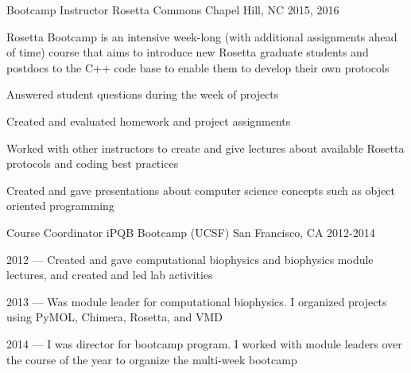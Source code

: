 

\begin{cventries}

  \cventry
  {Bootcamp Instructor} %
  {Rosetta Commons} %
  {Chapel Hill, NC} %
  {2015, 2016} %
  {
    \begin{cvitems} %
    \item Rosetta Bootcamp is an intensive week-long (with additional assignments ahead of time) course
      that aims to introduce new Rosetta graduate students and postdocs to the C++ code base
      to enable them to develop their own protocols
    \item Answered student questions during the week of projects
    \item Created and evaluated homework and project assignments
    \item Worked with other instructors to create and give lectures about available Rosetta protocols and coding best practices
    \item Created and gave presentations about computer science concepts such as object oriented programming
    \end{cvitems}
  }

  \cventry
  {Course Coordinator} %
  {iPQB Bootcamp (UCSF)} %
  {San Francisco, CA} %
  {2012-2014} %
  {
    \begin{cvitems} %
    \item {2012 --- Created and gave computational biophysics and biophysics module lectures, and created and led lab activities}
    \item {2013 --- Was module leader for computational biophysics. I organized projects using PyMOL, Chimera, Rosetta, and VMD}
    \item {2014 --- I was director for bootcamp program. I worked with module leaders over the course of the year to organize the multi-week bootcamp}
    \end{cvitems}
  }


\end{cventries}
